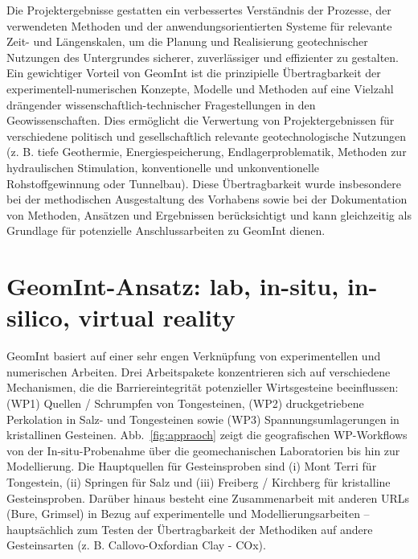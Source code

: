 Die Projektergebnisse gestatten ein verbessertes Verständnis der Prozesse, der verwendeten Methoden und der anwendungsorientierten Systeme für relevante Zeit- und Längenskalen, um die Planung und Realisierung geotechnischer Nutzungen des Untergrundes sicherer, zuverlässiger und effizienter zu gestalten. Ein gewichtiger Vorteil von GeomInt ist die prinzipielle Übertragbarkeit der experimentell-numerischen Konzepte, Modelle und Methoden auf eine Vielzahl drängender wissenschaftlich-technischer Fragestellungen in den Geowissenschaften. Dies ermöglicht die Verwertung von Projektergebnissen für verschiedene politisch und gesellschaftlich relevante geotechnologische Nutzungen (z. B. tiefe Geothermie, Energiespeicherung, Endlagerproblematik, Methoden zur hydraulischen Stimulation, konventionelle und unkonventionelle Rohstoffgewinnung oder Tunnelbau). Diese Übertragbarkeit wurde insbesondere bei der methodischen Ausgestaltung des Vorhabens sowie bei der Dokumentation von Methoden, Ansätzen und Ergebnissen berücksichtigt und kann gleichzeitig als Grundlage für potenzielle Anschlussarbeiten zu GeomInt dienen.

\section*{GeomInt-Ansatz: lab, in-situ, in-silico, virtual reality}

GeomInt basiert auf einer sehr engen Verknüpfung von experimentellen und numerischen Arbeiten. Drei Arbeitspakete konzentrieren sich auf verschiedene Mechanismen, die die Barriereintegrität potenzieller Wirtsgesteine beeinflussen: (WP1) Quellen / Schrumpfen von Tongesteinen, (WP2) druckgetriebene Perkolation in Salz- und Tongesteinen sowie (WP3) Spannungsumlagerungen in kristallinen Gesteinen.
%
Abb.~\ref{fig:appraoch} zeigt die geografischen WP-Workflows von der In-situ-Probenahme über die geomechanischen Laboratorien bis hin zur Modellierung. Die Hauptquellen für Gesteinsproben sind (i) Mont Terri für Tongestein, (ii) Springen für Salz und (iii) Freiberg / Kirchberg für kristalline Gesteinsproben. Darüber hinaus besteht eine Zusammenarbeit mit anderen URLs (Bure, Grimsel) in Bezug auf experimentelle und Modellierungsarbeiten – hauptsächlich zum Testen der Übertragbarkeit der Methodiken auf andere Gesteinsarten (z. B. Callovo-Oxfordian Clay - COx).


